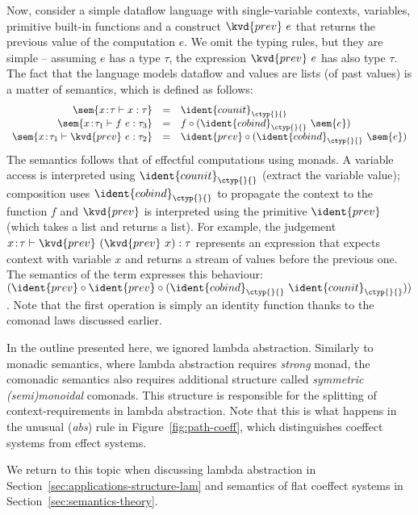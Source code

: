 Now, consider a simple dataflow language with single-variable contexts, variables,
primitive built-in functions and a construct $\kvd{prev}~e$ that returns the previous
value of the computation $e$. We omit the typing rules, but they are simple -- assuming $e$
has a type $\tau$, the expression $\kvd{prev}~e$ has also type $\tau$. The fact that
the language models dataflow and values are lists (of past values) is a matter of semantics,
which is defined as follows:
%
\begin{equation*}
\begin{array}{rcl}
\sem{x\!:\!\tau \vdash x : \tau} &=& \ident{counit}_\ctyp{}{}\\
\sem{x\!:\!\tau_1 \vdash f~e : \tau_3} &=& f \circ (\ident{cobind}_\ctyp{}{} ~\sem{e})\\
\sem{x\!:\!\tau_1 \vdash \kvd{prev}~e : \tau_2} &=& \ident{prev} \circ (\ident{cobind}_\ctyp{}{} ~\sem{e})\\
\end{array}
\end{equation*}
%
The semantics follows that of effectful computations using monads. A variable access is interpreted
using $\ident{counit}_\ctyp{}{}$ (extract the variable value); composition
uses $\ident{cobind}_\ctyp{}{}$ to propagate the context to the function $f$ and $\kvd{prev}$
is interpreted using the primitive $\ident{prev}$ (which takes a list and returns a list).
For example, the judgement $x\!:\!\tau \vdash \kvd{prev}~(\kvd{prev}~x) : \tau$ represents an
expression that expects context with variable $x$ and returns a stream of values before the
previous one. The semantics of the term expresses this behaviour:
$(\ident{prev} \circ \ident{prev} \circ (\ident{cobind}_\ctyp{}{}~\ident{counit}_\ctyp{}{}))$.
Note that the first operation is simply an identity function thanks to the comonad laws discussed
earlier.

In the outline presented here, we ignored lambda abstraction. Similarly to monadic semantics,
where lambda abstraction requires \emph{strong} monad, the comonadic semantics also requires
additional structure called \emph{symmetric (semi)monoidal} comonads. This structure is
responsible for the splitting of context-requirements in lambda abstraction. Note that this is
what happens in the unusual (\emph{abs}) rule in Figure~\ref{fig:path-coeff}, which distinguishes
coeffect systems from effect systems.

We return to this topic when discussing lambda abstraction in Section~\ref{sec:applications-structure-lam}
and semantics of flat coeffect systems in Section~\ref{sec:semantics-theory}.

